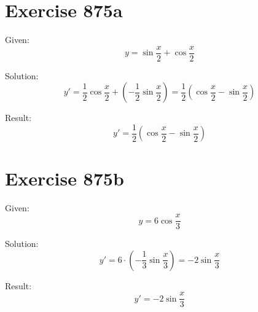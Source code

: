 \documentclass[a4paper, 10pt]{scrartcl}
\begin{document}
\section{Exercise 875a}

Given:
\[
y = \sin{\frac{x}{2}} + \cos{\frac{x}{2}}
\]

Solution:
\[
y' = \frac{1}{2}\cos{\frac{x}{2}} + (-\frac{1}{2}\sin{\frac{x}{2}}) = \frac{1}{2}(\cos{\frac{x}{2}} - \sin{\frac{x}{2}})
\]

Result:
\[
y' = \frac{1}{2}(\cos{\frac{x}{2}} - \sin{\frac{x}{2}})
\]

\section{Exercise 875b}

Given:
\[
y = 6\cos{\frac{x}{3}}
\]

Solution:
\[
y' = 6\cdot(-\frac{1}{3}\sin{\frac{x}{3}}) = -2\sin{\frac{x}{3}}
\]

Result:
\[
y' = -2\sin{\frac{x}{3}}
\]
\end{document}
